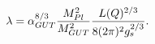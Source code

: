 \begin{equation}
\lambda=\alpha_{GUT}^{8/3}
{ M_{Pl}^2 \over M_{GUT}^2 }
{L(Q)^{2/3}\over 8 (2\pi)^2 g_{s}^{2/3}}.
\end{equation}

